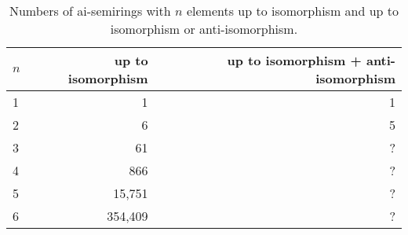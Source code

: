 \documentclass{article}
\begin{document}
\begin{table}[h]
  \centering
  \begin{tabular}{l|r|r}
    \toprule
    $n$ & up to isomorphism & up to isomorphism + anti-isomorphism \\
    \midrule
    1 & 1      & 1 \\
    2 & 6      & 5 \\
    3 & 61     & ? \\
    4 & 866    & ? \\
    5 & 15,751 & ? \\
    6 & 354,409 & ? \\
  \end{tabular}
  \caption{Numbers of ai-semirings with $n$ elements up to isomorphism and up
  to isomorphism or anti-isomorphism.}
  \label{tab:example}
\end{table}
\end{document}
